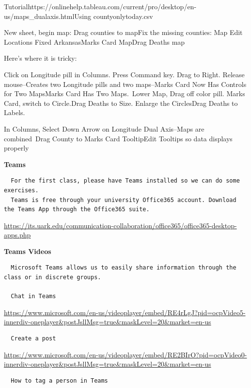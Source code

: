 \documentclass[]{book}
\begin{document}
Tutorialhttps://onlinehelp.tableau.com/current/pro/desktop/en-us/maps\_dualaxis.htmlUsing countyonlytoday.csv

New sheet, begin map: Drag counties to mapFix the missing counties: Map \textbar{} Edit Locations \textbar{} Fixed \textbar{} ArkansasMarks Card \textbar{} MapDrag Deaths map

{Here's where it is tricky}:

Click on Longitude pill in Columns. Press Command key. Drag to Right. Release mouse--Creates two Longitude pills and two maps--Marks Card Now Has Controls for Two MapsMarks Card Has Two Maps.~Lower Map, Drag off color pill. Marks Card, switch to Circle.Drag Deaths to Size. Enlarge the CirclesDrag Deaths to Labels.

In Columns, Select Down Arrow on Longitude \textbar{} Dual Axis--Maps are combined~Drag County to Marks Card \textbar{} TooltipEdit Tooltips so data displays properly

\textbf{Teams}

\begin{verbatim}
  For the first class, please have Teams installed so we can do some exercises.    
  Teams is free through your university Office365 account. Download the Teams App through the Office365 suite.
\end{verbatim}

\url{https://its.uark.edu/communication-collaboration/office365/office365-desktop-apps.php}

\textbf{Teams Videos}

\begin{verbatim}
  Microsoft Teams allows us to easily share information through the class or in discrete groups.
  
  Chat in Teams
\end{verbatim}

\url{https://www.microsoft.com/en-us/videoplayer/embed/RE4rLgJ?pid=ocpVideo5-innerdiv-oneplayer\&postJsllMsg=true\&maskLevel=20\&market=en-us}

\begin{verbatim}
  Create a post
\end{verbatim}

\url{https://www.microsoft.com/en-us/videoplayer/embed/RE2BIrO?pid=ocpVideo0-innerdiv-oneplayer\&postJsllMsg=true\&maskLevel=20\&market=en-us}

\begin{verbatim}
  How to tag a person in Teams
\end{verbatim}
\end{document}
